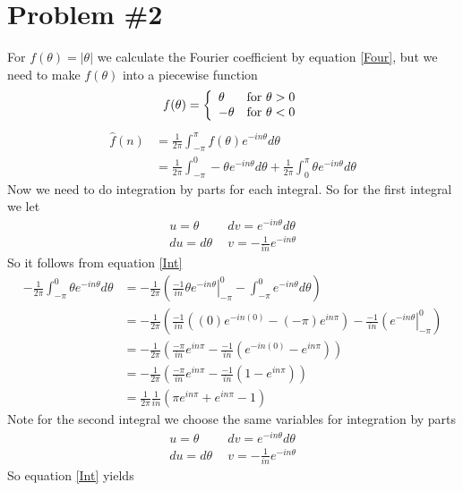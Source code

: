 \documentclass[11pt]{article}
\numberwithin{equation}{section}
\begin{document}
\section{Problem \#2}
For $f(\theta) = |\theta|$ we calculate the Fourier coefficient by equation \ref{Four}, but we need to make $f(\theta)$ into a piecewise function 
$$f(\theta) = \left\{\begin{array}{lc}
		\theta	&\textnormal{for}\ \theta>0\\
		-\theta	&\textnormal{for}\ \theta<0
			\end{array}\right.$$
\begin{align*}
\hat{f}(n) &= \frac{1}{2\pi}\int_{-\pi}^{\pi}f(\theta)e^{-in\theta}d\theta\\
&= \frac{1}{2\pi}\int_{-\pi}^{0}-\theta e^{-in\theta}d\theta + \frac{1}{2\pi}\int_{0}^{\pi}\theta e^{-in\theta}d\theta
\end{align*}
Now we need to do integration by parts for each integral. So for the first integral we let
\begin{align*}
u = \theta\ \  &dv = e^{-in\theta}d\theta\\
du = d\theta\ \  &v = -\frac{1}{in}e^{-in\theta}
\end{align*}
So it follows from equation \ref{Int} 
\begin{align*}
-\frac{1}{2\pi}\int_{-\pi}^{0}\theta e^{-in\theta}d\theta &= -\frac{1}{2\pi}\left(\left.\frac{-1}{in}\theta e^{-in\theta}\right|_{-\pi}^{0}-\int_{-\pi}^{0}e^{-in\theta}d\theta \right)\\
&= -\frac{1}{2\pi}\left(\frac{-1}{in}\left((0)e^{-in(0)} - (-\pi)e^{in\pi}\right)-\frac{-1}{in}\left(e^{-in\theta}\right|_{-\pi}^{0} \right)\\
&= -\frac{1}{2\pi}\left(\frac{-\pi}{in}e^{in\pi}-\frac{-1}{in}\left(e^{-in(0)} - e^{in\pi}\right)\right)\\
&= -\frac{1}{2\pi}\left(\frac{-\pi}{in}e^{in\pi}-\frac{-1}{in}\left(1 - e^{in\pi}\right)\right)\\
&= \frac{1}{2\pi}\frac{1}{in}\left(\pi e^{in\pi}+ e^{in\pi}- 1 \right)
\end{align*}
Note for the second integral we choose the same variables for integration by parts
\begin{align*}
u = \theta\ \  &dv = e^{-in\theta}d\theta\\
du = d\theta\ \  &v = -\frac{1}{in}e^{-in\theta}
\end{align*}
So equation \ref{Int} yields
\end{document}
